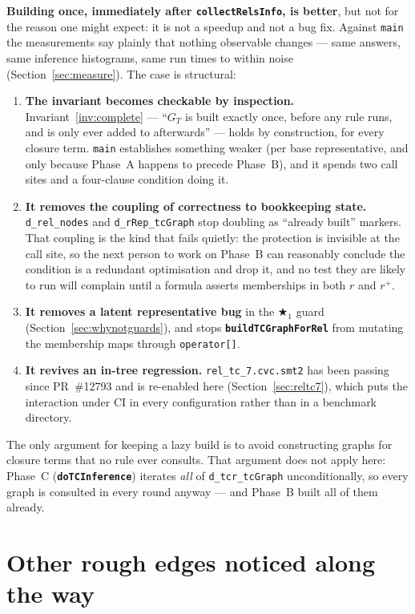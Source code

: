 \documentclass[11pt,a4paper]{article}
\newcommand{\code}[1]{\texttt{\small #1}}
\newcommand{\fn}[1]{\texttt{\small\bfseries #1}}
\newcommand{\tc}[1]{{#1}^{+}}
\theoremstyle{definition}
\begin{document}
\textbf{Building once, immediately after \fn{collectRelsInfo}, is better}, but
not for the reason one might expect: it is not a speedup and not a bug fix.
Against \code{main} the measurements say plainly that nothing observable changes
--- same answers, same inference histograms, same run times to within noise
(Section~\ref{sec:measure}). The case is structural:

\begin{enumerate}[leftmargin=*,itemsep=2pt]
\item \textbf{The invariant becomes checkable by inspection.}
  Invariant~\ref{inv:complete} --- ``$G_T$ is built exactly once, before any rule
  runs, and is only ever added to afterwards'' --- holds by construction, for
  every closure term. \code{main} establishes something weaker (per base
  representative, and only because Phase~A happens to precede Phase~B), and it
  spends two call sites and a four-clause condition doing it.
\item \textbf{It removes the coupling of correctness to bookkeeping state.}
  \code{d\_rel\_nodes} and \code{d\_rRep\_tcGraph} stop doubling as
  ``already built'' markers. That coupling is the kind that fails quietly: the
  protection is invisible at the call site, so the next person to work on
  Phase~B can reasonably conclude the condition is a redundant optimisation and
  drop it, and no test they are likely to run will complain until a formula
  asserts memberships in both $r$ and $\tc{r}$.
\item \textbf{It removes a latent representative bug} in the $\bigstar_1$ guard
  (Section~\ref{sec:whynotguards}), and stops \fn{buildTCGraphForRel} from
  mutating the membership maps through \code{operator[]}.
\item \textbf{It revives an in-tree regression.}
  \code{rel\_tc\_7.cvc.smt2} has been passing since PR~\#12793 and is re-enabled
  here (Section~\ref{sec:reltc7}), which puts the interaction under CI in every
  configuration rather than in a benchmark directory.
\end{enumerate}

\noindent
The only argument for keeping a lazy build is to avoid constructing graphs for
closure terms that no rule ever consults. That argument does not apply here:
Phase~C (\fn{doTCInference}) iterates \emph{all} of \code{d\_tcr\_tcGraph}
unconditionally, so every graph is consulted in every round anyway --- and
Phase~B built all of them already.

\section{Other rough edges noticed along the way}
\end{document}
